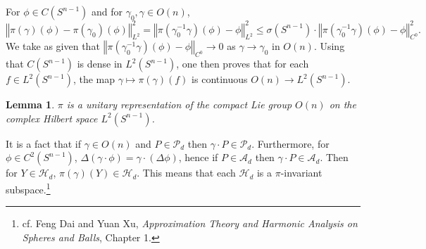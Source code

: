 \documentclass{article}
\newcommand{\norm}[1]{\left\Vert #1 \right\Vert}
\newtheorem{lemma}[theorem]{Lemma}
\theoremstyle{definition}
\begin{document}
For $\phi \in C(S^{n-1})$ and for $\gamma_0,  \gamma \in O(n)$, 
\[
\norm{\pi(\gamma)(\phi)-\pi(\gamma_0)(\phi)}_{L^2}^2=\norm{\pi(\gamma_0^{-1}\gamma)(\phi) - \phi}_{L^2}^2
\leq \sigma(S^{n-1}) \cdot \norm{\pi(\gamma_0^{-1}\gamma)(\phi) - \phi}_{C^0}^2.
\]
We take as given that $\norm{\pi(\gamma_0^{-1}\gamma)(\phi) - \phi}_{C^0} \to 0$ as $\gamma \to \gamma_0$ 
in $O(n)$. 
Using that $C(S^{n-1})$ is dense in $L^2(S^{n-1})$, one then proves that for each $f \in L^2(S^{n-1})$, the map
$\gamma \mapsto \pi(\gamma)(f)$ is continuous $O(n) \to L^2(S^{n-1})$. 

\begin{lemma}
$\pi$ is a unitary representation of the compact Lie group $O(n)$ on the complex Hilbert space $L^2(S^{n-1})$. 
\end{lemma}

It is a fact that if $\gamma \in O(n)$ and $P \in \mathscr{P}_d$ then $\gamma \cdot P \in \mathscr{P}_d$. 
Furthermore, for $\phi \in C^2(S^{n-1})$, $\Delta (\gamma\cdot \phi) = \gamma \cdot (\Delta \phi)$, hence
if $P \in \mathscr{A}_d$ then $\gamma \cdot P \in \mathscr{A}_d$. 
Then for $Y \in \mathscr{H}_d$, $\pi(\gamma)(Y)  \in \mathscr{H}_d$. This means that
each $\mathscr{H}_d$ is a $\pi$-invariant subspace.\footnote{cf. Feng Dai and Yuan Xu,
{\em Approximation Theory and Harmonic Analysis on Spheres and Balls},
Chapter 1.}
\end{document}
